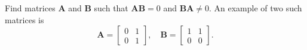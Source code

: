 Find matrices $\mathbf{A}$ and $\mathbf{B}$ such that $\mathbf{AB}= 0$ and $\mathbf{BA} \neq 0$.
\newline
An example of two such matrices is
\[
\mathbf{A} = \begin{bmatrix}
0 & 1\\
0 & 1
\end{bmatrix},\quad \mathbf{B} = \begin{bmatrix}
1 & 1\\
0 & 0
\end{bmatrix}.
\]